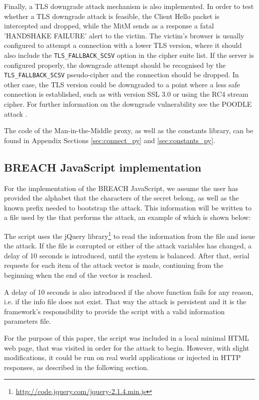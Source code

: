 Finally, a TLS downgrade attack mechanism is also implemented. In order to test
whether a TLS downgrade attack is feasible, the Client Hello packet is
intercepted and dropped, while the MitM sends as a response a fatal 'HANDSHAKE
FAILURE' alert to the victim. The victim's browser is usually configured to
attempt a connection with a lower TLS version, where it should also include the
\texttt{TLS\_FALLBACK\_SCSV} option in the cipher suite list. If the server is
configured properly, the downgrade attempt should be recognised by the
\texttt{TLS\_FALLBACK\_SCSV} pseudo-cipher and the connection should be dropped.
In other case, the TLS version could be downgraded to a point where a less safe
connection is established, such as with version SSL 3.0 or using the RC4 stream
cipher. For further information on the downgrade vulnerability see the POODLE
attack \cite{poodle}.

The code of the Man-in-the-Middle proxy, as well as the constants library, can
be found in Appendix Sections \ref{sec:connect_py} and \ref{sec:constants_py}.

\subsection{BREACH JavaScript implementation}

For the implementation of the BREACH JavaScript, we assume the user has provided
the alphabet that the characters of the secret belong, as well as the known
prefix needed to bootstrap the attack. This information will be written to a
file used by the that performs the attack, an example of which is shown below:


The script uses the jQuery
library\footnote{\url{http://code.jquery.com/jquery-2.1.4.min.js}} to read the
information from the file and issue the attack. If the file is corrupted or
either of the attack variables has changed, a delay of 10 seconds is introduced,
until the system is balanced. After that, serial requests for each item of the
attack vector is made, continuing from the beginning when the end of the vector
is reached.

A delay of 10 seconds is also introduced if the above function fails for any
reason, i.e. if the info file does not exist. That way the attack is persistent
and it is the framework's responsibility to provide the script with a valid
information parameters file.

For the purpose of this paper, the script was included in a local minimal HTML
web page, that was visited in order for the attack to begin. However, with
slight modifications, it could be run on real world applications or injected in
HTTP responses, as described in the following section.

